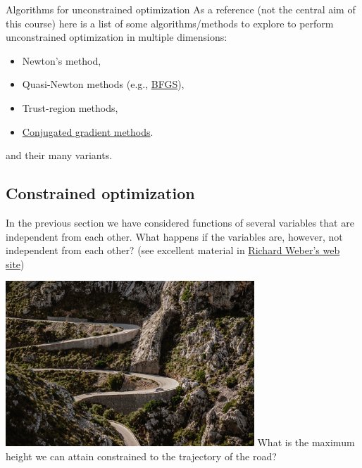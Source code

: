 \documentclass[c]{beamer}
\begin{document}
\begin{frame}{Algorithms for unconstrained optimization}
  As a reference (not the central aim of this course) here is a list of some algorithms/methods to explore to perform unconstrained optimization in multiple dimensions:
  \begin{itemize}
    \item Newton's method,
    \item Quasi-Newton methods (e.g., \href{https://machinelearningmastery.com/bfgs-optimization-in-python/}{BFGS}),
    \item Trust-region methods,
    \item \href{https://en.wikipedia.org/wiki/Conjugate_gradient_method}{Conjugated gradient methods}.
  \end{itemize}
  and their many variants.
\end{frame}

\subsection{Constrained optimization}

\begin{frame}
In the previous section we have considered functions of several variables that are independent from each other. What happens if the variables are, however, not independent from each other? (see excellent material in \href{https://www.statslab.cam.ac.uk/~rrw1/}{Richard Weber's web site})

  \begin{center}
    \includegraphics[width=0.7\textwidth]{../figures/mallorca.jpg}\newline
    What is the maximum height we can attain constrained to the trajectory of the road?
  \end{center}
\end{frame}
\end{document}
